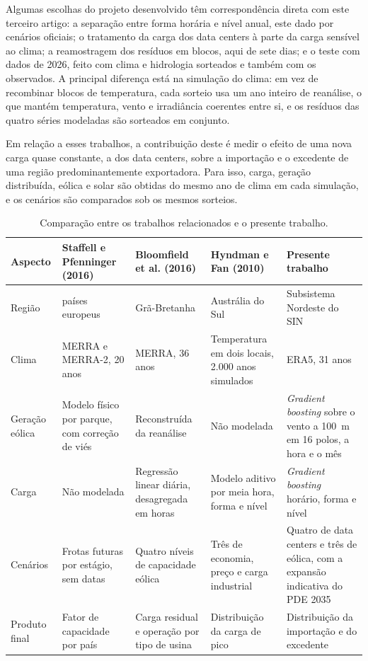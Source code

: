 Algumas escolhas do projeto desenvolvido têm correspondência direta com este terceiro artigo: a separação entre forma horária e nível anual, este dado por cenários oficiais; o tratamento da carga dos data centers à parte da carga sensível ao clima; a reamostragem dos resíduos em blocos, aqui de sete dias; e o teste com dados de 2026, feito com clima e hidrologia sorteados e também com os observados. A principal diferença está na simulação do clima: em vez de recombinar blocos de temperatura, cada sorteio usa um ano inteiro de reanálise, o que mantém temperatura, vento e irradiância coerentes entre si, e os resíduos das quatro séries modeladas são sorteados em conjunto.

Em relação a esses trabalhos, a contribuição deste é medir o efeito de uma nova carga quase constante, a dos data centers, sobre a importação e o excedente de uma região predominantemente exportadora. Para isso, carga, geração distribuída, eólica e solar são obtidas do mesmo ano de clima em cada simulação, e os cenários são comparados sob os mesmos sorteios.

\begin{table}[H]
\centering
\caption{Comparação entre os trabalhos relacionados e o presente trabalho.}
\label{tab:comparacao}
\footnotesize
\renewcommand{\arraystretch}{1.25}
\setlength{\tabcolsep}{4pt}
\begin{tabularx}{\textwidth}{@{}>{\raggedright\arraybackslash}p{1.6cm}>{\raggedright\arraybackslash}X>{\raggedright\arraybackslash}X>{\raggedright\arraybackslash}X>{\raggedright\arraybackslash}X@{}}
\toprule
Aspecto & Staffell e Pfenninger (2016) & Bloomfield et al. (2016) & Hyndman e Fan (2010) & Presente trabalho \\
\midrule
Região & 23 países europeus & Grã-Bretanha & Austrália do Sul & Subsistema Nordeste do SIN \\
Clima & MERRA e MERRA-2, 20 anos & MERRA, 36 anos & Temperatura em dois locais, 2.000 anos simulados & ERA5, 31 anos \\
Geração eólica & Modelo físico por parque, com correção de viés & Reconstruída da reanálise & Não modelada & \textit{Gradient boosting} sobre o vento a 100~m em 16 polos, a hora e o mês \\
Carga & Não modelada & Regressão linear diária, desagregada em horas & Modelo aditivo por meia hora, forma e nível & \textit{Gradient boosting} horário, forma e nível \\
Cenários & Frotas futuras por estágio, sem datas & Quatro níveis de capacidade eólica & Três de economia, preço e carga industrial & Quatro de data centers e três de eólica, com a expansão indicativa do PDE 2035 \parencite{epe_pde2035} \\
Produto final & Fator de capacidade por país & Carga residual e operação por tipo de usina & Distribuição da carga de pico & Distribuição da importação e do excedente \\
\bottomrule
\end{tabularx}
\end{table}

\pagebreak
